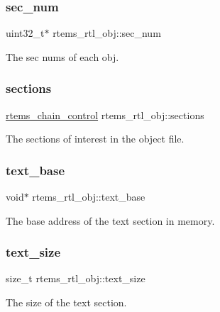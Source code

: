 \subsubsection{\texorpdfstring{sec\_num}{sec\_num}}
{\footnotesize\ttfamily uint32\+\_\+t$\ast$ rtems\+\_\+rtl\+\_\+obj\+::sec\+\_\+num}

The sec nums of each obj. \mbox{\label{structrtems__rtl__obj_add88613b5efee7985b69c4f6fef76cb8}} 
\subsubsection{\texorpdfstring{sections}{sections}}
{\footnotesize\ttfamily \mbox{\hyperlink{unionChain__Control}{rtems\+\_\+chain\+\_\+control}} rtems\+\_\+rtl\+\_\+obj\+::sections}

The sections of interest in the object file. \mbox{\label{structrtems__rtl__obj_ab179c5ca3286552e677ef8ab3e60f8a4}} 
\subsubsection{\texorpdfstring{text\_base}{text\_base}}
{\footnotesize\ttfamily void$\ast$ rtems\+\_\+rtl\+\_\+obj\+::text\+\_\+base}

The base address of the text section in memory. \mbox{\label{structrtems__rtl__obj_a53d5c820d48902d081f639db1fce12bd}} 
\subsubsection{\texorpdfstring{text\_size}{text\_size}}
{\footnotesize\ttfamily size\+\_\+t rtems\+\_\+rtl\+\_\+obj\+::text\+\_\+size}

The size of the text section. \mbox{\label{structrtems__rtl__obj_a848481b6873e3d840c55cd4a83108606}} 
